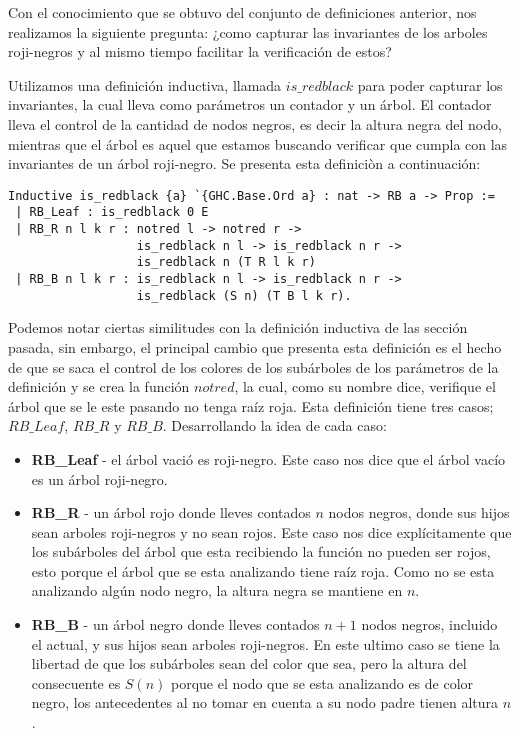 \documentclass[letterpaper,12pt,oneside]{book}
\newcommand{\arn}{árbol roji-negro}
\newcommand{\arns}{arboles roji-negros}
\theoremstyle{plain}
\theoremstyle{definition}
\theoremstyle{remark}
\begin{document}
Con el conocimiento que se obtuvo del conjunto de definiciones anterior, nos realizamos la siguiente 
pregunta: ¿como capturar las invariantes de los {\arns} y al mismo tiempo facilitar la verificaci\'on de 
estos?

Utilizamos una definición inductiva, llamada $is\_redblack$ para poder capturar los invariantes, la cual lleva como parámetros un contador y un \'arbol. El contador lleva el control de la cantidad de nodos negros, es decir la altura negra del nodo, mientras que el \'arbol es aquel que estamos buscando
verificar que cumpla con las invariantes de un {\arn}. Se presenta esta definici\`on a continuaci\'on:

\begin{verbatim}
Inductive is_redblack {a} `{GHC.Base.Ord a} : nat -> RB a -> Prop :=
 | RB_Leaf : is_redblack 0 E
 | RB_R n l k r : notred l -> notred r ->
                  is_redblack n l -> is_redblack n r ->
                  is_redblack n (T R l k r)
 | RB_B n l k r : is_redblack n l -> is_redblack n r ->
                  is_redblack (S n) (T B l k r).
\end{verbatim}

Podemos notar ciertas similitudes con la definición inductiva de las secci\'on pasada, sin embargo, el 
principal cambio que presenta esta definición es el hecho de que se saca el control de los colores de los
subárboles de los parámetros de la definici\'on y se crea la funci\'on $notred$, la cual, como su nombre 
dice, verifique el \'arbol que se le este pasando no tenga raíz roja. Esta definici\'on tiene tres casos;
$RB\_Leaf$, $RB\_R$ y $RB\_B$. Desarrollando la idea de cada caso:

\begin{itemize}
        \item \textbf{RB\_Leaf} - el árbol vació es roji-negro. Este caso nos dice que el \'arbol vacío 
        es un {\arn}.
        \item \textbf{RB\_R} - un árbol rojo donde lleves contados $n$ nodos negros, donde sus hijos sean
        {\arns} y no sean rojos. Este caso nos dice explícitamente que los subárboles del árbol que esta 
        recibiendo la función no pueden ser rojos, esto porque el árbol que se esta analizando tiene raíz
        roja. Como no se esta analizando algún nodo negro, la altura negra se mantiene en $n$.
        \item \textbf{RB\_B} - un árbol negro donde lleves contados $n+1$ nodos negros, incluido el 
        actual, y sus hijos sean {\arns}. En este ultimo caso se tiene la libertad de que los subárboles 
        sean del color que sea, pero la altura del consecuente es $S(n)$ porque el nodo que se esta 
        analizando es de color negro, los antecedentes al no tomar en cuenta a su nodo padre tienen 
        altura $n$.
\end{itemize}
\end{document}
